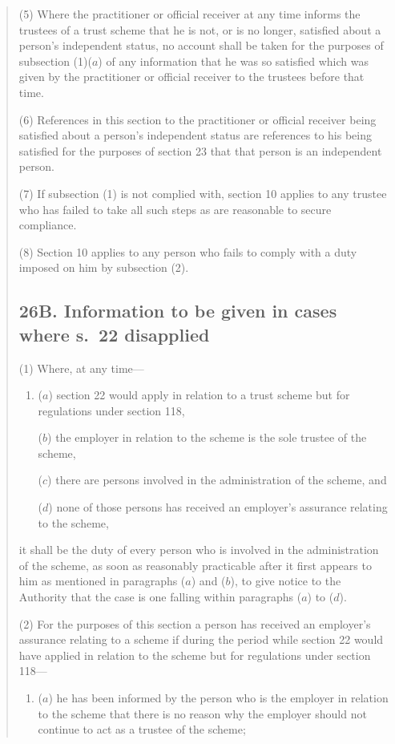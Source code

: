 \documentclass[12pt,a4paper]{article}
\begin{document}
\begin{quotation}
(5) Where the practitioner or official receiver at any time informs the trustees of a trust scheme that he is not, or is no longer, satisfied about a person’s independent status, no account shall be taken for the purposes of subsection (1)($a$)  of any information that he was so satisfied which was given by the practitioner or official receiver to the trustees before that time.

(6) References in this section to the practitioner or official receiver being satisfied about a person’s independent status are references to his being satisfied for the purposes of section 23 that that person is an independent person.

(7) If subsection (1)  is not complied with, section 10 applies to any trustee who has failed to take all such steps as are reasonable to secure compliance.

(8) Section 10 applies to any person who fails to comply with a duty imposed on him by subsection (2).

\subsection*{26B. Information to be given in cases where s.\ 22 disapplied}

(1) Where, at any time—
\begin{enumerate}\item[]
($a$) section 22 would apply in relation to a trust scheme but for regulations under section 118,

($b$) the employer in relation to the scheme is the sole trustee of the scheme,

($c$) there are persons involved in the administration of the scheme, and

($d$) none of those persons has received an employer’s assurance relating to the scheme,
\end{enumerate}
it shall be the duty of every person who is involved in the administration of the scheme, as soon as reasonably practicable after it first appears to him as mentioned in paragraphs ($a$)  and ($b$), to give notice to the Authority that the case is one falling within paragraphs ($a$)  to ($d$).

(2) For the purposes of this section a person has received an employer’s assurance relating to a scheme if during the period while section 22 would have applied in relation to the scheme but for regulations under section 118—
\begin{enumerate}\item[]
($a$) he has been informed by the person who is the employer in relation to the scheme that there is no reason why the employer should not continue to act as a trustee of the scheme;


\end{enumerate}
\end{quotation}
\end{document}
